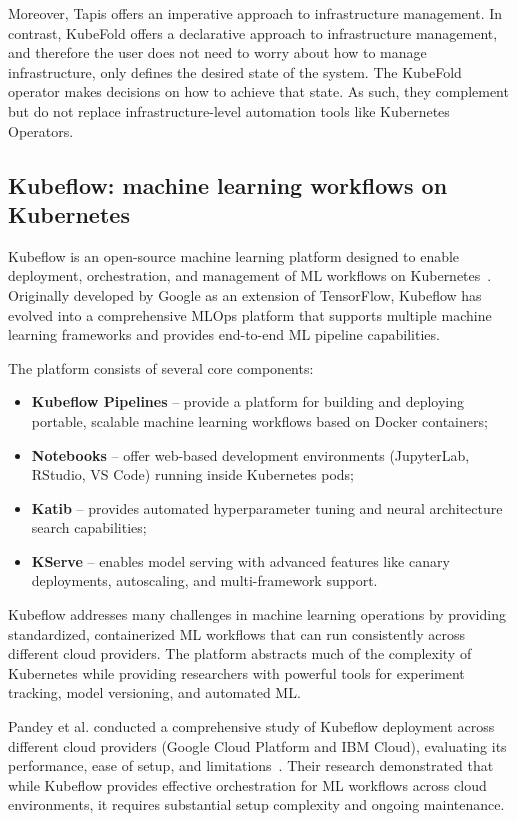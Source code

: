 Moreover, Tapis offers an imperative approach to infrastructure management. In contrast, KubeFold offers a declarative approach to infrastructure management, and therefore the user does not need to worry about how to manage infrastructure, only defines the desired state of the system. The KubeFold operator makes decisions on how to achieve that state.
As such, they complement but do not replace infrastructure-level automation tools like Kubernetes Operators.

\subsection{Kubeflow: machine learning workflows on Kubernetes}

Kubeflow is an open-source machine learning platform designed to enable deployment, orchestration, and management of ML workflows on Kubernetes~\cite{kubeflow,kubeflow_deployment_study}.
Originally developed by Google as an extension of TensorFlow, Kubeflow has evolved into a comprehensive MLOps platform that supports multiple machine learning frameworks and provides end-to-end ML pipeline capabilities.

The platform consists of several core components:
\begin{itemize}
    \item \textbf{Kubeflow Pipelines} -- provide a platform for building and deploying portable, scalable machine learning workflows based on Docker containers;
    \item \textbf{Notebooks} -- offer web-based development environments (JupyterLab, RStudio, VS Code) running inside Kubernetes pods;
    \item \textbf{Katib} -- provides automated hyperparameter tuning and neural architecture search capabilities;
    \item \textbf{KServe} -- enables model serving with advanced features like canary deployments, autoscaling, and multi-framework support.
\end{itemize}

Kubeflow addresses many challenges in machine learning operations by providing standardized, containerized ML workflows that can run consistently across different cloud providers.
The platform abstracts much of the complexity of Kubernetes while providing researchers with powerful tools for experiment tracking, model versioning, and automated ML.

Pandey et al. conducted a comprehensive study of Kubeflow deployment across different cloud providers (Google Cloud Platform and IBM Cloud), evaluating its performance, ease of setup, and limitations~\cite{kubeflow_deployment_study}.
Their research demonstrated that while Kubeflow provides effective orchestration for ML workflows across cloud environments, it requires substantial setup complexity and ongoing maintenance.

